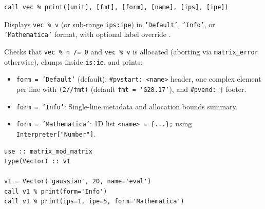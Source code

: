 \lstset{language=[95]Fortran}
\begin{lstlisting}
call vec % print([unit], [fmt], [form], [name], [ips], [ipe])
\end{lstlisting}

Displays \texttt{vec \% v} (or sub-range \texttt{ips:ipe}) in \texttt{'Default'}, \texttt{'Info'}, or \texttt{'Mathematica'} format, with optional label override .

Checks that \texttt{vec \% n /= 0} and \texttt{vec \% v} is allocated (aborting via \texttt{matrix\_error} otherwise), clamps  inside \texttt{is:ie}, and prints:
\begin{itemize}
  \item \texttt{form = 'Default'} (default): \texttt{\#pvstart: <name>} header, one complex element per line with \texttt{(2//fmt)} (default \texttt{fmt = 'G28.17'}), and \texttt{\#pvend: ]} footer.
  \item \texttt{form = 'Info'}: Single-line metadata and allocation bounds summary.
  \item \texttt{form = 'Mathematica'}: 1D list \texttt{<name> = \{...\};} using \texttt{Interpreter["Number"]}.
\end{itemize}

\begin{description}[leftmargin=2.2cm, style=nextline]
\end{description}

\lstset{language=[95]Fortran}
\begin{lstlisting}
use :: matrix_mod_matrix
type(Vector) :: v1

v1 = Vector('gaussian', 20, name='eval')
call v1 % print(form='Info')
call v1 % print(ips=1, ipe=5, form='Mathematica')
\end{lstlisting}

